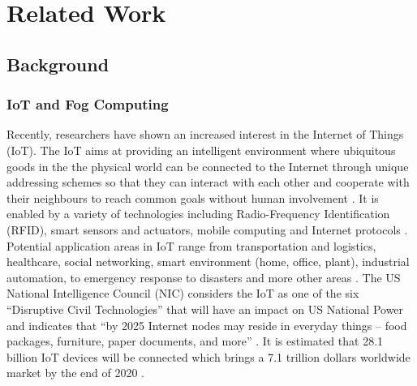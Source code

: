 \chapter{Related Work}\label{ch3}


\section{Background} \label{background}

\subsection{IoT and Fog Computing} 

Recently, researchers have shown an increased interest in the Internet of Things (IoT). The IoT aims at providing an intelligent environment where ubiquitous goods in the the physical world can be connected to the Internet through unique addressing schemes so that they can interact with each other and cooperate with their neighbours to reach common goals without human involvement \autocite{Atzori20102787}.  It is enabled by a variety of technologies including Radio-Frequency Identification (RFID), smart sensors and actuators, mobile computing and Internet protocols \autocite{7123563}. Potential application areas in IoT range from transportation and logistics, healthcare, social networking, smart environment (home, office, plant), industrial automation, to emergency response to disasters and more other areas \autocite{Atzori20102787, 7123563}. The US National Intelligence Council (NIC) considers the IoT as one of the six ``Disruptive Civil Technologies” that will have an impact on US National Power and indicates that ``by 2025 Internet nodes may reside in everyday things -- food packages, furniture, paper documents, and more'' \autocite{strategic2008disruptive}. It is estimated that 28.1 billion IoT devices will be connected which brings a 7.1 trillion dollars worldwide market by the end of 2020 \autocite{lund2014worldwide}.

